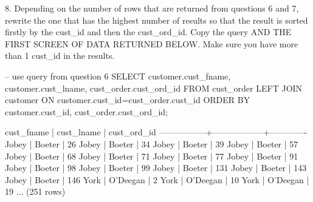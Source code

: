 8. Depending on the number of rows that are returned from questions 6 and 7, rewrite the one that has the highest number of results so that the result is sorted firstly by the cust\_id and then the cust\_ord\_id. Copy the query AND THE FIRST SCREEN OF DATA RETURNED BELOW. Make sure you have more than 1 cust\_id in the results.
\begin{sql}
-- use query from question 6
SELECT customer.cust_fname, customer.cust_lname, cust_order.cust_ord_id FROM cust_order
LEFT JOIN customer ON customer.cust_id=cust_order.cust_id
ORDER BY customer.cust_id, cust_order.cust_ord_id;
\end{sql}
\begin{pseudo*}
   cust_fname    |    cust_lname    | cust_ord_id
-----------------+------------------+-------------
 Jobey           | Boeter           |          26
 Jobey           | Boeter           |          34
 Jobey           | Boeter           |          39
 Jobey           | Boeter           |          57
 Jobey           | Boeter           |          68
 Jobey           | Boeter           |          71
 Jobey           | Boeter           |          77
 Jobey           | Boeter           |          91
 Jobey           | Boeter           |          98
 Jobey           | Boeter           |          99
 Jobey           | Boeter           |         131
 Jobey           | Boeter           |         143
 Jobey           | Boeter           |         146
 York            | O'Deegan         |           2
 York            | O'Deegan         |          10
 York            | O'Deegan         |          19
 ...
(251 rows)
\end{pseudo*}

